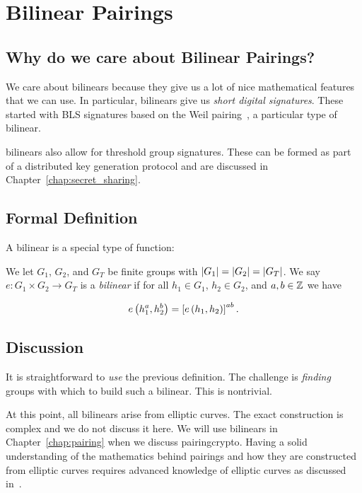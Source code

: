 \section{Bilinear Pairings}
\label{sec:math_pairings}

\subsection{Why do we care about Bilinear Pairings?}

We care about \glspl{bilinear} because they give us a lot of nice
mathematical features that we can use.
In particular, \glspl{bilinear} give us
\emph{short digital signatures}.
These started with BLS signatures based on the Weil
pairing~\cite{BLSSignatures},
a particular type of \gls{bilinear}.

\Glspl{bilinear} also allow for threshold group signatures.
These can be formed as part of a \gls{distributed key generation}
protocol and are discussed in Chapter~\ref{chap:secret_sharing}.

\subsection{Formal Definition}

A \gls{bilinear} is a special type of \gls{function}:

\begin{defn}
We let $G_{1}$, $G_{2}$, and $G_{T}$ be \glspl{finite group} with
$\left| G_{1} \right| = \left| G_{2} \right| = \left| G_{T} \right|$.
We say $e:G_{1}\times G_{2}\to G_{T}$ is a \emph{\gls{bilinear}}
if for all $h_{1}\in G_{1}$, $h_{2}\in G_{2}$, and $a,b\in\mathbb{Z}$
we have

\begin{equation}
    e\left( h_{1}^{a},h_{2}^{b} \right) = \left[ e\left( h_{1},h_{2} \right) \right]^{ab}.
\end{equation}
\end{defn}

\subsection{Discussion}

It is straightforward to \emph{use} the previous definition.
The challenge is \emph{finding} \glspl{group} with which to build such a
\gls{bilinear}.
This is nontrivial.

At this point, all \glspl{bilinear} arise from \glspl{elliptic curve}.
The exact construction is complex and we do not discuss it here.
We will use \glspl{bilinear} in Chapter~\ref{chap:pairing}
when we discuss \gls{pairingcrypto}.
Having a solid understanding of the mathematics behind pairings
and how they are constructed from \glspl{elliptic curve}
requires advanced knowledge of \glspl{elliptic curve} as discussed
in~\cite{AEC}.
